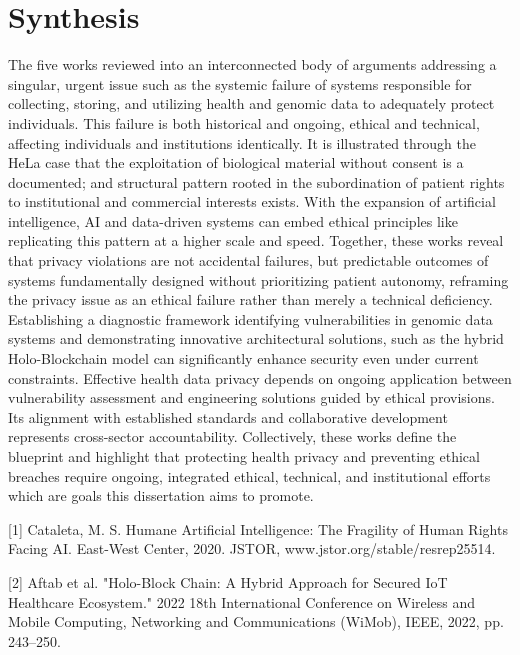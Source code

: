 \documentclass[12pt]{article}
\begin{document}
\section{Synthesis}
The five works reviewed into an interconnected body of arguments addressing a singular, urgent issue such as the systemic failure of systems responsible for collecting, storing, and utilizing health and genomic data to adequately protect individuals. This failure is both historical and ongoing, ethical and technical, affecting individuals and institutions identically. It is illustrated through the HeLa case that the exploitation of biological material without consent is a documented; and structural pattern rooted in the subordination of patient rights to institutional and commercial interests exists. With the expansion of artificial intelligence, AI and data-driven systems can embed ethical principles like replicating this pattern at a higher scale and speed. Together, these works reveal that privacy violations are not accidental failures, but predictable outcomes of systems fundamentally designed without prioritizing patient autonomy, reframing the privacy issue as an ethical failure rather than merely a technical deficiency. Establishing a diagnostic framework identifying vulnerabilities in genomic data systems and demonstrating innovative architectural solutions, such as the hybrid Holo-Blockchain model can significantly enhance security even under current constraints. Effective health data privacy depends on ongoing application between vulnerability assessment and engineering solutions guided by ethical provisions. Its alignment with established standards and collaborative development represents cross-sector accountability. Collectively, these works define the blueprint and highlight that protecting health privacy and preventing ethical breaches require ongoing, integrated ethical, technical, and institutional efforts which are goals this dissertation aims to promote.



[1] Cataleta, M. S. Humane Artificial Intelligence: The Fragility of Human Rights Facing AI. East-West Center, 2020. JSTOR, www.jstor.org/stable/resrep25514.

[2] Aftab et al. "Holo-Block Chain: A Hybrid Approach for Secured IoT Healthcare Ecosystem." 2022 18th International Conference on Wireless and Mobile Computing, Networking and Communications (WiMob), IEEE, 2022, pp. 243–250.
\end{document}
